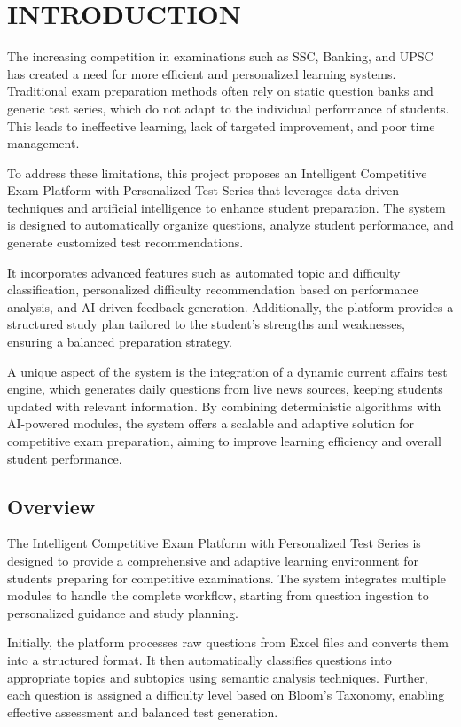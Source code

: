 \chapter{INTRODUCTION}
\begin{sloppypar}

The increasing competition in examinations such as SSC, Banking, and UPSC has created a need for more efficient and personalized learning systems. Traditional exam preparation methods often rely on static question banks and generic test series, which do not adapt to the individual performance of students. This leads to ineffective learning, lack of targeted improvement, and poor time management.

To address these limitations, this project proposes an Intelligent Competitive Exam Platform with Personalized Test Series that leverages data-driven techniques and artificial intelligence to enhance student preparation. The system is designed to automatically organize questions, analyze student performance, and generate customized test recommendations.

It incorporates advanced features such as automated topic and difficulty classification, personalized difficulty recommendation based on performance analysis, and AI-driven feedback generation. Additionally, the platform provides a structured study plan tailored to the student's strengths and weaknesses, ensuring a balanced preparation strategy.

A unique aspect of the system is the integration of a dynamic current affairs test engine, which generates daily questions from live news sources, keeping students updated with relevant information. By combining deterministic algorithms with AI-powered modules, the system offers a scalable and adaptive solution for competitive exam preparation, aiming to improve learning efficiency and overall student performance.

\section{Overview}

The Intelligent Competitive Exam Platform with Personalized Test Series is designed to provide a comprehensive and adaptive learning environment for students preparing for competitive examinations. The system integrates multiple modules to handle the complete workflow, starting from question ingestion to personalized guidance and study planning.

Initially, the platform processes raw questions from Excel files and converts them into a structured format. It then automatically classifies questions into appropriate topics and subtopics using semantic analysis techniques. Further, each question is assigned a difficulty level based on Bloom's Taxonomy, enabling effective assessment and balanced test generation.


\end{sloppypar}
